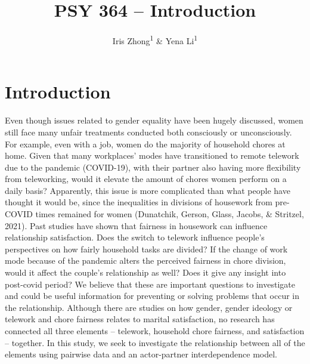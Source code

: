 \documentclass[
  english,
  man]{apa6}
\title{PSY 364 -- Introduction}
\author{Iris Zhong\textsuperscript{1} \& Yena Li\textsuperscript{1}}
\date{}
\affiliation{\vspace{0.5cm}\textsuperscript{1} Smith College}
\begin{document}
\maketitle

\hypertarget{introduction}{%
\section{Introduction}\label{introduction}}

Even though issues related to gender equality have been hugely discussed, women still face many unfair treatments conducted both consciously or unconsciously. For example, even with a job, women do the majority of household chores at home. Given that many workplaces' modes have transitioned to remote telework due to the pandemic (COVID-19), with their partner also having more flexibility from teleworking, would it elevate the amount of chores women perform on a daily basis? Apparently, this issue is more complicated than what people have thought it would be, since the inequalities in divisions of housework from pre-COVID times remained for women (Dunatchik, Gerson, Glass, Jacobs, \& Stritzel, 2021). Past studies have shown that fairness in housework can influence relationship satisfaction. Does the switch to telework influence people's perspectives on how fairly household tasks are divided? If the change of work mode because of the pandemic alters the perceived fairness in chore division, would it affect the couple's relationship as well? Does it give any insight into post-covid period? We believe that these are important questions to investigate and could be useful information for preventing or solving problems that occur in the relationship. Although there are studies on how gender, gender ideology or telework and chore fairness relates to marital satisfaction, no research has connected all three elements -- telework, household chore fairness, and satisfaction -- together. In this study, we seek to investigate the relationship between all of the elements using pairwise data and an actor-partner interdependence model.
\end{document}

